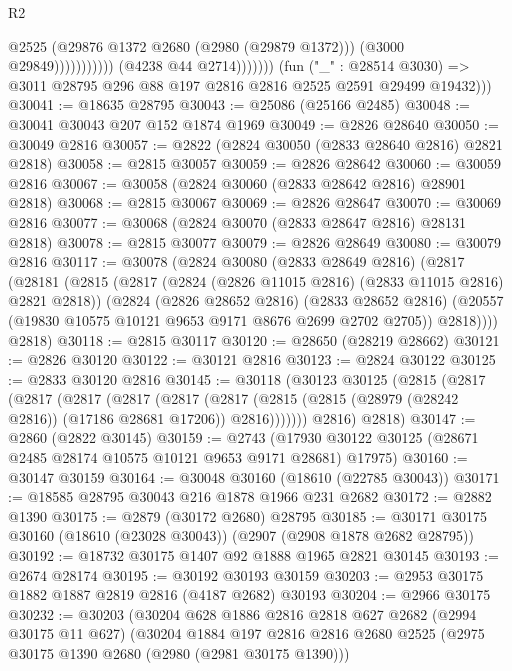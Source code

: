 \begin{lexlean}{R2}
\begin{coremodule}
                                        @2525
                                        (@29876 @1372 @2680 (@2980 (@29879 @1372)))
                                        (@3000 @29849)))))))))))
                    (@4238 @44 @2714)))))))
        (fun ("_" : @28514 @3030) =>
        @3011 @28795 @296 @88 @197 @2816 @2816 @2525 @2591 @29499 @19432)))
@30041 := @18635 @28795
@30043 := @25086 (@25166 @2485)
@30048 := @30041 @30043 @207 @152 @1874 @1969
@30049 := @2826 @28640
@30050 := @30049 @2816
@30057 := @2822 (@2824 @30050 (@2833 @28640 @2816) @2821 @2818)
@30058 := @2815 @30057
@30059 := @2826 @28642
@30060 := @30059 @2816
@30067 := @30058 (@2824 @30060 (@2833 @28642 @2816) @28901 @2818)
@30068 := @2815 @30067
@30069 := @2826 @28647
@30070 := @30069 @2816
@30077 := @30068 (@2824 @30070 (@2833 @28647 @2816) @28131 @2818)
@30078 := @2815 @30077
@30079 := @2826 @28649
@30080 := @30079 @2816
@30117 := @30078
    (@2824
      @30080
      (@2833 @28649 @2816)
      (@2817
        (@28181
          (@2815
            (@2817 (@2824 (@2826 @11015 @2816) (@2833 @11015 @2816) @2821 @2818))
            (@2824
              (@2826 @28652 @2816)
              (@2833 @28652 @2816)
              (@20557 (@19830 @10575 @10121 @9653 @9171 @8676 @2699 @2702 @2705))
              @2818))))
      @2818)
@30118 := @2815 @30117
@30120 := @28650 (@28219 @28662)
@30121 := @2826 @30120
@30122 := @30121 @2816
@30123 := @2824 @30122
@30125 := @2833 @30120 @2816
@30145 := @30118
    (@30123
      @30125
      (@2815
        (@2817
          (@2817
            (@2817
              (@2817
                (@2817
                  (@2817 (@2815 (@2815 (@28979 (@28242 @2816)) (@17186 @28681 @17206)) @2816)))))))
        @2816)
      @2818)
@30147 := @2860 (@2822 @30145)
@30159 := @2743 (@17930 @30122 @30125 (@28671 @2485 @28174 @10575 @10121 @9653 @9171 @28681) @17975)
@30160 := @30147 @30159
@30164 := @30048 @30160 (@18610 (@22785 @30043))
@30171 := @18585 @28795 @30043 @216 @1878 @1966 @231 @2682
@30172 := @2882 @1390
@30175 := @2879 (@30172 @2680) @28795
@30185 := @30171 @30175 @30160 (@18610 (@23028 @30043)) (@2907 (@2908 @1878 @2682 @28795))
@30192 := @18732 @30175 @1407 @92 @1888 @1965 @2821 @30145
@30193 := @2674 @28174
@30195 := @30192 @30193 @30159
@30203 := @2953 @30175 @1882 @1887 @2819 @2816 (@4187 @2682) @30193
@30204 := @2966 @30175
@30232 := @30203
    (@30204
      @628
      @1886
      @2816
      @2818
      @627
      @2682
      (@2994 @30175 @11 @627)
      (@30204
        @1884
        @197
        @2816
        @2816
        @2680
        @2525
        (@2975 @30175 @1390 @2680 (@2980 (@2981 @30175 @1390)))

\end{coremodule}
\end{lexlean}
